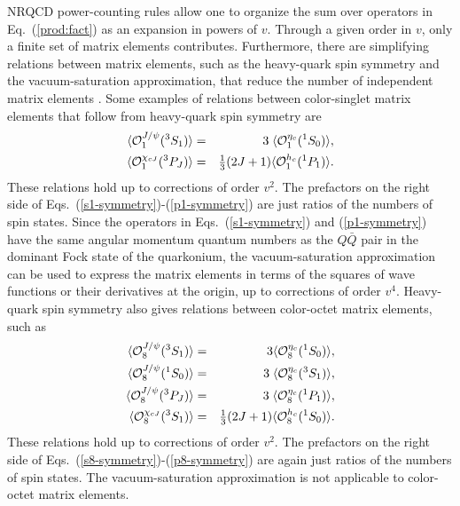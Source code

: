 NRQCD power-counting rules allow one to organize the sum over
operators in Eq.~(\ref{prod:fact}) as an expansion in powers of
$v$. Through a given order in $v$, only a finite set of matrix
elements contributes. Furthermore, there are simplifying relations
between matrix elements, such as the heavy-quark spin symmetry and the
vacuum-saturation approximation, that reduce the number of independent
matrix elements \cite{Bodwin:1994jh}. 
Some examples of relations between color-singlet matrix elements
that follow from heavy-quark spin symmetry are 
%
\begin{eqnarray}
\langle{\cal O}^{J/\psi}_1({}^3S_1)\rangle &=&
3 \;\langle{\cal O}^{\eta_c}_1({}^1S_0)\rangle,
\label{s1-symmetry}
\\ 
\langle{\cal O}^{\chi_{cJ}}_1({}^3P_J)\rangle &=& 
\mbox{$1\over 3$} (2J+1) \langle{\cal O}^{h_c}_1({}^1P_1)\rangle. 
\label{p1-symmetry}    
\end{eqnarray}                                                  
%
These relations hold up to corrections of order $v^2$. 
The prefactors on the right side of 
Eqs.~(\ref{s1-symmetry})-(\ref{p1-symmetry})
are just ratios of the numbers of spin states.
Since the operators in Eqs.~(\ref{s1-symmetry}) and 
(\ref{p1-symmetry}) have the same angular momentum 
quantum numbers as the $Q \bar Q$ pair in the dominant 
Fock state of the quarkonium, 
the vacuum-saturation approximation can be used to express the
matrix elements in terms of the squares of wave functions 
or their derivatives at the origin, 
up to corrections of order $v^4$. 
Heavy-quark spin symmetry also gives relations between 
color-octet matrix elements, such as
%
\begin{eqnarray}
\langle{\cal O}^{J/\psi}_8({}^3S_1)\rangle &=&
3\langle{\cal O}^{\eta_c}_8({}^1S_0)\rangle,
\label{s8-symmetry}
\\
\langle{\cal O}^{J/\psi}_8({}^1S_0)\rangle &=&
3 \; \langle{\cal O}^{\eta_c}_8({}^3S_1)\rangle, 
\\
\langle{\cal O}^{J/\psi}_8({}^3P_J)\rangle &=&
3 \; \langle{\cal O}^{\eta_c}_8({}^1P_1)\rangle,
\\
\langle{\cal O}^{\chi_{cJ}}_8({}^3S_1)\rangle &=& 
\mbox{$1\over 3$} (2J+1) \langle{\cal O}^{h_c}_8({}^1S_0)\rangle.
\label{p8-symmetry}
\end{eqnarray}                                                  
%
These relations hold up to corrections of order $v^2$. The prefactors
on the right side of Eqs.~(\ref{s8-symmetry})-(\ref{p8-symmetry}) are
again just ratios of the numbers of spin states.  The
vacuum-saturation approximation is not applicable to color-octet
matrix elements.

